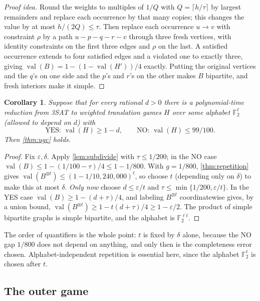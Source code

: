 \documentclass[11pt]{article}
\newtheorem{corollary}[theorem]{Corollary}
\theoremstyle{definition}
\theoremstyle{remark}
\newcommand{\F}{\mathbb F}
\newcommand{\eps}{\varepsilon}
\DeclareMathOperator{\val}{val}
\begin{document}
\begin{proof}[Proof idea]
Round the weights to multiples of $1/Q$ with $Q=\lceil h/\tau\rceil$ by
largest remainders and replace each occurrence by that many copies; this
changes the value by at most $h/(2Q)\le\tau$. Then replace each occurrence
$u\to v$ with constraint $\rho$ by a path $u-p-q-r-v$ through three fresh
vertices, with identity constraints on the first three edges and $\rho$ on the
last. A satisfied occurrence extends to four satisfied edges and a violated one
to exactly three, giving $\val(B)=1-(1-\val(H'))/4$ exactly. Putting the
original vertices and the $q$'s on one side and the $p$'s and $r$'s on the
other makes $B$ bipartite, and fresh interiors make it simple.
\end{proof}

\begin{corollary}\label{cor:amplify}
Suppose that for every rational $d>0$ there is a polynomial-time reduction from
3SAT to weighted translation games $H$ over some alphabet $\F_2^{\ell}$
(allowed to depend on $d$) with
\[
\text{YES: }\val(H)\ge1-d,\qquad \text{NO: }\val(H)\le 99/100 .
\]
Then \cref{thm:ugc} holds.
\end{corollary}

\begin{proof}
Fix $\eps,\delta$. Apply \cref{lem:subdivide} with $\tau\le1/200$; in the NO
case $\val(B)\le1-(1/100-\tau)/4\le1-1/800$. With $g=1/800$,
\cref{thm:repetition} gives $\val(B^{\otimes t})\le(1-1/10{,}240{,}000)^t$,
so choose $t$ (depending only on $\delta$) to make this at most $\delta$.
\emph{Only now} choose $d\le\eps/t$ and $\tau\le\min\{1/200,\eps/t\}$. In the
YES case $\val(B)\ge1-(d+\tau)/4$, and labeling $B^{\otimes t}$
coordinatewise gives, by a union bound,
$\val(B^{\otimes t})\ge1-t(d+\tau)/4\ge1-\eps/2$. The product of simple
bipartite graphs is simple bipartite, and the alphabet is $\F_2^{\ell t}$.
\end{proof}

The order of quantifiers is the whole point: $t$ is fixed by $\delta$ alone,
because the NO gap $1/800$ does not depend on anything, and only then is the
completeness error chosen. Alphabet-independent repetition is essential here,
since the alphabet $\F_2^\ell$ is chosen after $t$.

\subsection{The outer game}\label{sec:outer}
\end{document}

